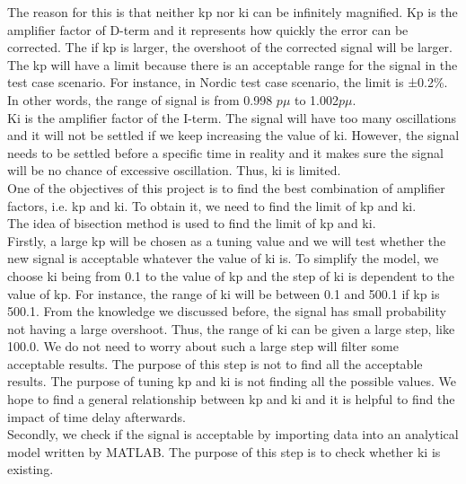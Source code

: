 \documentclass{report}
\begin{document}
The reason for this is that neither kp nor ki can be infinitely magnified. Kp is the amplifier factor of D-term and it represents how quickly the error can be corrected. The if kp is larger, the overshoot of the corrected signal will be larger. The kp will have a limit because there is an acceptable range for the signal in the test case scenario. For instance, in Nordic test case scenario, the limit is ±0.2\%. In other words, the range of signal is from 0.998 $p\mu$ to 1.002$p\mu$.\\

Ki is the amplifier factor of the I-term. The signal will have too many oscillations and it will not be settled if we keep increasing the value of ki. 
However, the signal needs to be settled before a specific time in reality and it makes sure the signal will be no chance of excessive oscillation. Thus, ki is limited.\\

One of the objectives of this project is to find the best combination of amplifier factors, i.e. kp and ki. To obtain it, we need to find the limit of kp and ki.\\

The idea of bisection method is used to find the limit of kp and ki.\\

Firstly, a large kp will be chosen as a tuning value and we will test whether the new signal is acceptable whatever the value of ki is. To simplify the model, we choose ki being from 0.1 to the value of kp and the step of ki is dependent to the value of kp. For instance, the range of ki will be between 0.1 and 500.1 if kp is 500.1. From the knowledge we discussed before, the signal has small probability not having a large overshoot. Thus, the range of ki can be given a large step, like 100.0. We do not need to worry about such a large step will filter some acceptable results. The purpose of this step is not to find all the acceptable results. The purpose of tuning kp and ki is not finding all the possible values. We hope to find a general relationship between kp and ki and it is helpful to find the impact of time delay afterwards.\\

Secondly, we check if the signal is acceptable by importing data into an analytical model written by MATLAB. The purpose of this step is to check whether ki is existing. \\
\end{document}
